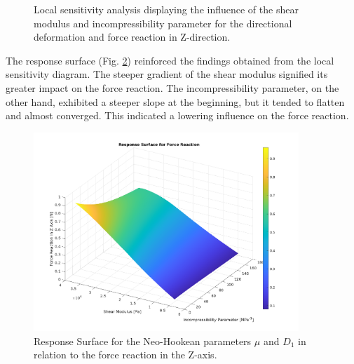 \begin{figure}%
    \centering
	\caption[Local sensitivity analysis - Initial parameter range]{Local sensitivity analysis displaying the influence of the shear modulus and incompressibility parameter for the directional deformation and force reaction in Z-direction.}%
	\label{fig:fullrangelocalsensi}%
 \end{figure}

The response surface (Fig. \ref{fig:rsoforce}) 
reinforced the findings obtained from the local sensitivity diagram. The steeper gradient of the shear modulus 
signified its greater impact on the force reaction. The incompressibility parameter, on the other hand, 
exhibited a steeper slope at the beginning, but it tended to flatten and almost converged. This indicated 
a lowering influence on the force reaction.

\begin{figure}%
	\centering
   \quad
   \includegraphics[width=10cm]{Images/ifem/plat NH 4 and 2 fullrange/rsoforce1.png}%
   \caption[Response surface - Force Reaction]{Response Surface for the Neo-Hookean parameters $\mu$ and $D_1$ in relation to the force reaction in the Z-axis.}%
   \label{fig:rsoforce}%
\end{figure}

